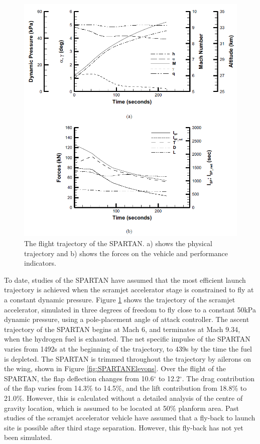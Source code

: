    \begin{figure}[!ht]
   	\centering
   	\includegraphics[width=0.9\linewidth]{figures/2_literature-review/SPARTAN_traj1}
   	\caption{The flight trajectory of the SPARTAN. a) shows the physical trajectory and b) shows the forces on the vehicle and performance indicators.}
   	\label{fig:SPARTAN_traj}
   \end{figure}
  
   To date, studies of the SPARTAN have assumed that the most efficient launch trajectory is achieved when the scramjet accelerator stage is constrained to fly at a constant dynamic pressure\cite{Preller2017b,Preller2018a}.
  Figure \ref{fig:SPARTAN_traj} shows the trajectory of the scramjet accelerator, simulated in three degrees of freedom to fly close to a constant 50kPa dynamic pressure, using a pole-placement angle of attack controller\cite{Preller2017b}.
  The ascent trajectory of the SPARTAN begins at Mach 6, and terminates at Mach 9.34, when the hydrogen fuel is exhausted\cite{Preller2018a}. 
  The net specific impulse of the SPARTAN varies from 1492s at the beginning of the trajectory, to 439s by the time the fuel is depleted\cite{Preller2017b}. 
  The SPARTAN is trimmed throughout the trajectory by ailerons on the wing, shown in Figure \ref{fig:SPARTANElevons}. Over the flight of the SPARTAN, the flap deflection changes from 10.6$^\circ$ to 12.2$^\circ$\cite{Preller2018a}. The drag contribution of the flap varies from 14.3\% to 14.5\%, and the lift contribution from 18.8\% to 21.0\%\cite{Preller2018a}. However, this is calculated without a detailed analysis of the centre of gravity location, which is assumed to be located at 50\% planform area. 
  Past studies of the scramjet accelerator vehicle have assumed that a fly-back to launch site is possible after third stage separation\cite{Preller2017b,Preller2018a}. However, this fly-back has not yet been simulated. 
  
